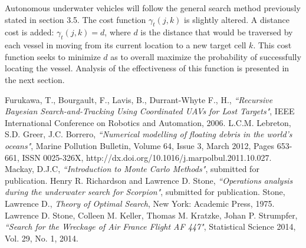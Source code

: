 \documentclass[a4paper]{article}
\begin{document}
Autonomous underwater vehicles will follow the general search method previously stated in section 3.5. The cost function $\gamma_t(j,k)$ is slightly altered. A distance cost is added: $\gamma_t(j,k)=d$, where $d$ is the distance that would be traversed by each vessel in moving from its current location to a new target cell $k$. This cost function seeks to minimize $d$ as to overall maximize the probability of successfully locating the vessel. Analysis of the effectiveness of this function is presented in the next section.





\pagebreak

\begin{thebibliography}{10}
 Furukawa, T., Bourgault, F., Lavis, B., Durrant-Whyte F., H., \emph{``Recursive Bayesian Search-and-Tracking Using Coordinated UAVs for Lost Targets"}, IEEE International Conference on Robotics and Automation, 2006. 
 L.C.M. Lebreton, S.D. Greer, J.C. Borrero, \emph{``Numerical modelling of floating debris in the world’s oceans"}, Marine Pollution Bulletin, Volume 64, Issue 3, March 2012, Pages 653-661, ISSN 0025-326X, http://dx.doi.org/10.1016/j.marpolbul.2011.10.027.
 Mackay, D.J.C, \emph{``Introduction to Monte Carlo Methods"}, submitted for publication.
 Henry R. Richardson and Lawrence D. Stone, \emph{``Operations analysis during the underwater search for Scorpion"}, submitted for publication. 
 Stone, Lawrence D., \textit{Theory of Optimal Search}, New York: Academic Press, 1975.
 Lawrence D. Stone, Colleen M. Keller, Thomas M. Kratzke, Johan P. Strumpfer, \emph{``Search for the Wreckage of Air France Flight AF 447"}, Statistical Science 2014, Vol. 29, No. 1, 2014.
\end{thebibliography}
\end{document}
